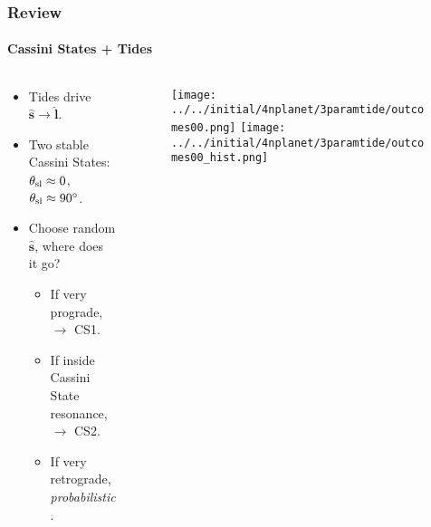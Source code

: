 \documentclass[dvipsnames]{beamer}
\newcommand*{\bm}[1]{\boldsymbol{\mathbf{#1}}}
\newcommand*{\uv}[1]{\hat{\bm{#1}}}
\begin{document}
\begin{frame}
    \frametitle{Review}
    \framesubtitle{Cassini States + Tides}

    \begin{columns}
        \begin{column}{0.5\columnwidth}
            \begin{itemize}
                \item Tides drive $\uv{s} \to \uv{l}$.

                \item Two stable Cassini States: $\theta_{\rm sl} \approx 0$,
                    $\theta_{\rm sl} \approx 90^\circ$.

                \item Choose random $\uv{s}$, where does it go?
                    \begin{itemize}
                        \item If very prograde, $\to$ CS1.
                        \item If inside Cassini State resonance, $\to$ CS2.
                        \item If very retrograde, \emph{probabilistic}.
                    \end{itemize}
            \end{itemize}
        \end{column}
        \begin{column}{0.5\columnwidth}
            \begin{figure}
                \centering
                \texttt{[image: ../../initial/4nplanet/3paramtide/outcomes00.png]}
                \texttt{[image: ../../initial/4nplanet/3paramtide/outcomes00\_hist.png]}
            \end{figure}
        \end{column}
    \end{columns}
\end{frame}
\end{document}
